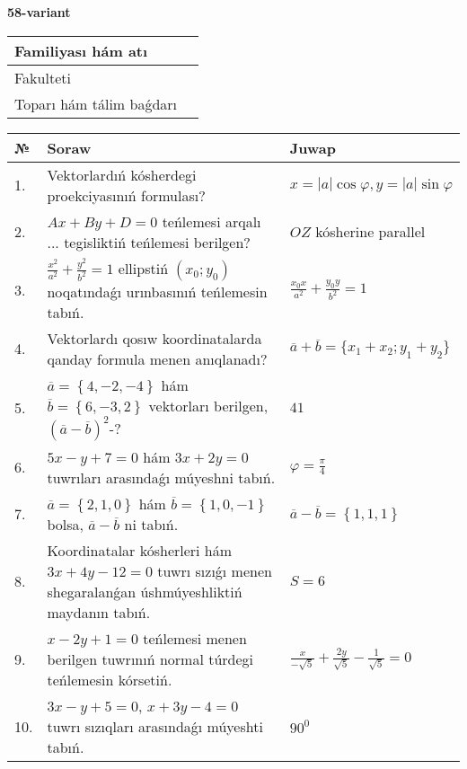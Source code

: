 \documentclass{article}
\begin{document}
\egroup

\newpage


\textbf{58-variant}\\

\bgroup
\def\arraystretch{1.6} %

\begin{tabular}{|m{5.7cm}|m{9.5cm}|}
\hline
Familiyası hám atı & \\
\hline
Fakulteti  & \\
\hline
Toparı hám tálim baǵdarı  & \\
\hline
\end{tabular}

\vspace{1cm}

\begin{tabular}{|m{0.7cm}|m{10cm}|m{4cm}|}
\hline
№ & Soraw & Juwap \\
\hline
1. & Vektorlardıń kósherdegi proekciyasınıń formulası? & $x=|a|\cos\varphi, y=|a|\sin\varphi$ \\
\hline
2. & $Ax+By+D=0$ teńlemesi arqalı ... tegisliktiń teńlemesi berilgen? & $OZ$ kósherine parallel \\
\hline
3. & $\frac{x^2}{a^2}+\frac{y^2}{b^2}=1$ ellipstiń $(x_0;y_0)$ noqatındaǵı urınbasınıń teńlemesin tabıń. & $\frac{x_0x}{a^2}+\frac{y_0y}{b^2}=1$ \\
\hline
4. & Vektorlardı qosıw koordinatalarda qanday formula menen anıqlanadı? & $\overline{a}+\overline{b}=\{x_1+x_2;y_1+y_2\}$ \\
\hline
5. & $\overline{a}=\left\{ 4,-2,-4 \right\}$ hám $\overline{b}=\left\{ 6,-3, 2 \right\}$ vektorları berilgen, $(\overline{a}-\overline{b}) ^{2}$-? & $41$ \\
\hline
6. & $5x-y+7=0$ hám $3x+2y=0$ tuwrıları arasındaǵı múyeshni tabıń. & $\varphi=\frac{\pi}{4}$ \\
\hline
7. & $\overline{a}=\left\{ 2, 1, 0 \right\}$ hám $\overline{b}=\left\{ 1, 0,-1 \right\}$ bolsa, $\overline{a}-\overline{b}$ ni tabıń. & $\overline{a} -\overline{b} = \left\{ 1,1,1 \right\}$ \\
\hline
8. & Koordinatalar kósherleri hám $ 3x+4y-12=0 $ tuwrı sızıǵı menen shegaralanǵan úshmúyeshliktiń maydanın tabıń. & $ S=6 $ \\
\hline
9. & $x-2y+1=0$ teńlemesi menen berilgen tuwrınıń normal túrdegi teńlemesin kórsetiń. & $\frac{x}{- \sqrt{5}}+\frac{2y}{\sqrt{5}}-\frac{1}{\sqrt{5}}=0$ \\
\hline
10. & $3x-y+5=0$, $x+3y-4=0$ tuwrı sızıqları arasındaǵı múyeshti tabıń. & $90^{0}$ \\
\hline
\end{tabular}
\end{document}
